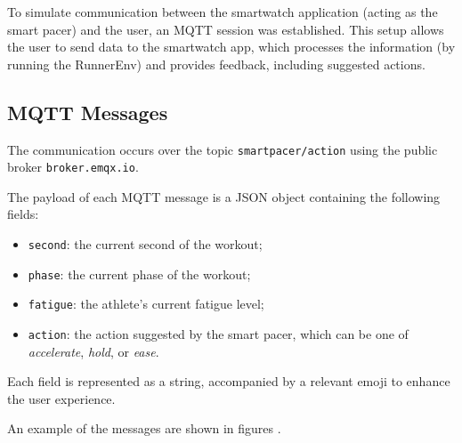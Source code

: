 To simulate communication between the smartwatch application (acting as the smart pacer) and the user, an MQTT session was established. This setup allows the user to send data to the smartwatch app, which processes the information (by running the RunnerEnv) and provides feedback, including suggested actions.

\subsection{MQTT Messages}
The communication occurs over the topic \texttt{smartpacer/action} using the public broker \texttt{broker.emqx.io}.

The payload of each MQTT message is a JSON object containing the following fields:
\begin{itemize}
  \item \texttt{second}: the current second of the workout;
  \item \texttt{phase}: the current phase of the workout;
  \item \texttt{fatigue}: the athlete's current fatigue level;
  \item \texttt{action}: the action suggested by the smart pacer, which can be one of \emph{accelerate}, \emph{hold}, or \emph{ease}.
\end{itemize}

Each field is represented as a string, accompanied by a relevant emoji to enhance the user experience.

An example of the messages are shown in figures .




  



